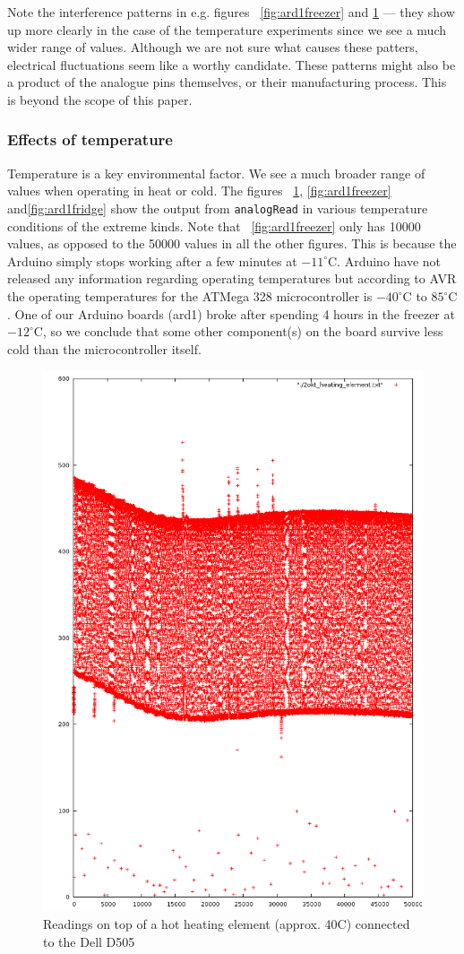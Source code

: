 \documentclass[a4paper]{article}           %
\begin{document}
Note the interference patterns in e.g. figures ~\ref{fig:ard1freezer} and \ref{fig:ard1heat} --- they show up more clearly in the case of the temperature experiments since we see a much wider range of values. Although we are not sure what causes these patters, electrical fluctuations seem like a worthy candidate. These patterns might also be a product of the analogue pins themselves, or their manufacturing process. This is beyond the scope of this paper. 


\subsubsection{Effects of temperature}
\FloatBarrier

Temperature is a key environmental factor. We see a much broader range of values when operating in heat or cold. The figures ~\ref{fig:ard1heat}, \ref{fig:ard1freezer} and\ref{fig:ard1fridge} show the output from \texttt{analogRead} in various temperature conditions of the extreme kinds. Note that ~\ref{fig:ard1freezer} only has 10000 values, as opposed to the 50000 values in all the other figures. This is because the Arduino simply stops working after a few minutes at $-11^\circ$C. Arduino have not released any information regarding operating temperatures but according to AVR the operating temperatures for the ATMega 328 microcontroller is $-40^\circ$C to $85^\circ$C \cite{atmegads}. One of our Arduino boards (ard1) broke after spending 4 hours in the freezer at $-12^\circ$C, so we conclude that some other component(s) on the board survive less cold than the microcontroller itself. 



\begin{figure}[H]
  \centering  
  \includegraphics[width=0.5\columnwidth]{img/Heating50k.png}
  \caption{Readings on top of a hot heating element (approx. 40C) connected to the Dell D505}
  \label{fig:ard1heat}
\end{figure}
\end{document}
